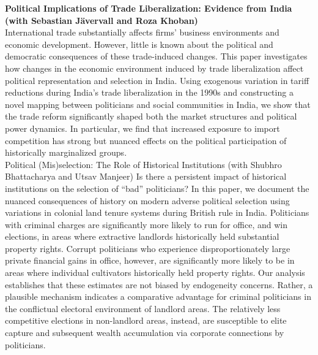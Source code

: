 \documentclass[11pt]{article}
\newcommand{\schoolwithcourses}[4]{
 \textbf{#1} \hfill{#2}\\
    #3\\
\vspace*{5pt}
}
\begin{document}
\schoolwithcourses{Political Implications of Trade Liberalization: Evidence from India \textnormal{(with Sebastian J\"{a}vervall and Roza Khoban)}}{}{\vspace{2mm} International trade substantially affects firms' business environments and economic development. However, little is known about the political and democratic consequences of these trade-induced changes. This paper investigates how changes in the economic environment induced by trade liberalization affect political representation and selection in India. Using exogenous variation in tariff reductions during India's trade liberalization in the 1990s and constructing a novel mapping between politicians and social communities in India, we show that the trade reform significantly shaped both the market structures and political power dynamics. In particular, we find that increased exposure to import competition has strong but nuanced effects on the political participation of historically marginalized groups. \vspace{2mm}}

\schoolwithcourses{Political (Mis)selection: The Role of Historical Institutions \textnormal{(with Shubhro Bhattacharya and Utsav Manjeer)}}{}{\vspace{2mm} Is there a persistent impact of historical institutions on the selection of ``bad'' politicians? In this paper, we document the nuanced consequences of history on modern adverse political selection using variations in colonial land tenure systems during British rule in India. Politicians with criminal charges are significantly more likely to run for office, and win elections, in areas where extractive landlords historically held substantial property rights. Corrupt politicians who experience disproportionately large private financial gains in office, however, are significantly more likely to be in areas where individual cultivators historically held property rights. Our analysis establishes that these estimates are not biased by endogeneity concerns. Rather, a plausible mechanism indicates a comparative advantage for criminal politicians in the conflictual electoral environment of landlord areas. The relatively less competitive elections in non-landlord areas, instead, are susceptible to elite capture and subsequent wealth accumulation via corporate connections by politicians.}  

\vspace{3mm}


\end{document}
